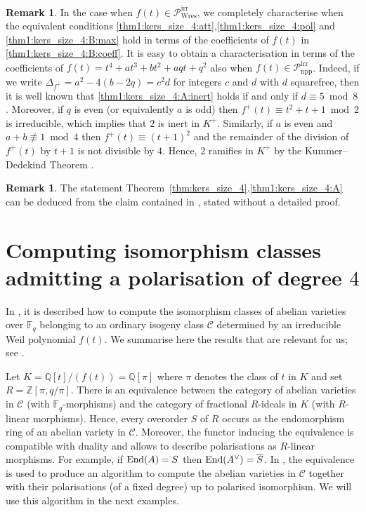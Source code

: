 \documentclass[11pt]{amsart}
\newcommand\Fq{\mathbb{F}_q}
\newcommand\Q{\mathbb{Q}}
\newcommand\Z{\mathbb{Z}}
\def\End{\mathop{\rm End}\nolimits}
\newcommand\cC{\mathcal{C}}
\theoremstyle{plain}
\theoremstyle{definition}
\newtheorem{remark}[theorem]{Remark}
\newcommand\PirrA{\mathcal{P}^\mathrm{irr}_\mathrm{npp}}
\newcommand\PirrB{\mathcal{P}^\mathrm{irr}_\mathrm{Wres}}
\begin{document}
\begin{remark}\label{rmk:coeffs}
    In the case when $f(t)\in\PirrB$, we completely characterise when the equivalent conditions \ref{thm1:kers_size_4:att},\ref{thm1:kers_size_4:pol} and \ref{thm1:kers_size_4:B:max} hold in terms of the coefficients of $f(t)$ in \ref{thm1:kers_size_4:B:coeff}.
    It is easy to obtain a characterisation in terms of the coefficients of $f(t)=t^4+at^3+bt^2+aqt+q^2$ also when $f(t)\in\PirrA$.
    Indeed, if we write $\Delta_{f^+} = a^2 -4(b-2q) = c^2 d$ for integers $c$ and $d$ with $d$ squarefree, then it is well known that \ref{thm1:kers_size_4:A:inert} holds if and only if $d\equiv 5 \bmod 8$.
    Moreover, if $q$ is even (or equivalently $a$ is odd) then $f^+(t) \equiv t^2+t+1 \bmod 2$ is irreducible, which implies that $2$ is inert in $K^+$.
    Similarly, if $a$ is even and $a+b\not\equiv 1 \bmod 4$ then 
    $f^+(t) \equiv (t+1)^2$ and the remainder of the division of $f^+(t)$ by $t+1$ is not divisible by $4$.
    Hence, $2$ ramifies in $K^+$ by the Kummer--Dedekind Theorem \cite[Thm.~8.2]{Stevenhagen08}.
\end{remark}
\begin{remark}\label{rmk:compare_with_Howe}
   The statement Theorem~\ref{thm:kers_size_4}.\ref{thm1:kers_size_4:A} can be deduced from the claim contained in \cite[page 155, 2nd par.~section 3]{Howe95Bounds}, stated without a detailed proof.
\end{remark}

\section{Computing isomorphism classes admitting a polarisation of degree \texorpdfstring{$4$}{4}}\label{s:examples}
In \cite{Mar21}, it is described how to compute the isomorphism classes of abelian varieties over $\Fq$ belonging to an ordinary isogeny class $\cC$ determined by an irreducible Weil polynomial $f(t)$.
We summarise here the results that are relevant for us; see \cite[Cor.~4.4, Thm.~5.4]{Mar21}.

Let $K=\Q[t]/(f(t)) = \Q[\pi]$ where $\pi$ denotes the class of $t$ in $K$ and set $R=\Z[\pi,q/\pi]$.
There is an equivalence between the category of abelian varieties in $\cC$ (with $\Fq$-morphisms) and the category of fractional $R$-ideals in $K$ (with $R$-linear morphisms).
Hence, every overorder $S$ of $R$ occurs as the endomorphism ring of an abelian variety in $\cC$.
Moreover, the functor inducing the equivalence is compatible with duality and allows to describe polarisations as $R$-linear morphisms.
For example, if $\End(A)=S$ then $\End(A^\vee)=\overline{S}$.
In \cite[Sec.~6]{Mar21}, the equivalence is used to produce an algorithm to compute the abelian varieties in $\cC$ together with their polarisations (of a fixed degree) up to polarised isomorphism.
We will use this algorithm in the next examples.
\end{document}
